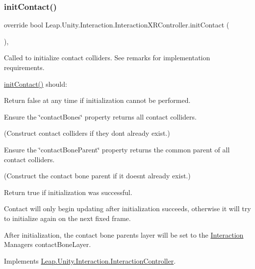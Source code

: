\subsubsection{\texorpdfstring{initContact()}{initContact()}}
{\footnotesize\ttfamily override bool Leap.\+Unity.\+Interaction.\+Interaction\+X\+R\+Controller.\+init\+Contact (\begin{DoxyParamCaption}{ }\end{DoxyParamCaption})\hspace{0.3cm}{\ttfamily [protected]}, {\ttfamily [virtual]}}



Called to initialize contact colliders. See remarks for implementation requirements. 

\mbox{\hyperlink{class_leap_1_1_unity_1_1_interaction_1_1_interaction_x_r_controller_a6646ebf671991c5bc47a66b2129538b6}{init\+Contact()}} should\+:
\begin{DoxyItemize}
\item Return false at any time if initialization cannot be performed.
\item Ensure the \char`\"{}contact\+Bones\char`\"{} property returns all contact colliders.
\begin{DoxyItemize}
\item (Construct contact colliders if they don\textquotesingle{}t already exist.)
\end{DoxyItemize}
\item Ensure the \char`\"{}contact\+Bone\+Parent\char`\"{} property returns the common parent of all contact colliders.
\begin{DoxyItemize}
\item (Construct the contact bone parent if it doesn\textquotesingle{}t already exist.)
\end{DoxyItemize}
\item Return true if initialization was successful.
\end{DoxyItemize}

Contact will only begin updating after initialization succeeds, otherwise it will try to initialize again on the next fixed frame.

After initialization, the contact bone parent\textquotesingle{}s layer will be set to the \mbox{\hyperlink{namespace_leap_1_1_unity_1_1_interaction}{Interaction}} Manager\textquotesingle{}s contact\+Bone\+Layer. 

Implements \mbox{\hyperlink{class_leap_1_1_unity_1_1_interaction_1_1_interaction_controller_a5d9713dd48f3093aefbd8ebbba3b0251}{Leap.\+Unity.\+Interaction.\+Interaction\+Controller}}.



